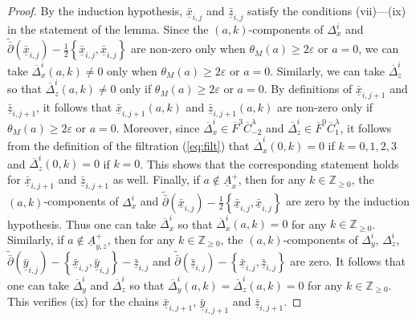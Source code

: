 \documentclass[a4paper]{article}
\numberwithin{equation}{section}
\begin{document}
\begin{proof}
By the induction hypothesis, $\bar{\underline{x}}_{i,j}$ and $\bar{\underline{z}}_{i,j}$ satisfy the conditions (vii)---(ix) in the statement of the lemma. Since the $(a,k)$-components of $\Delta_x^i$ and $\tilde{\bar{\partial}}(\bar{\underline{x}}_{i,j})-\frac{1}{2}\left\{\bar{\underline{x}}_{i,j},\bar{\underline{x}}_{i,j}\right\}$ are non-zero only when $\theta_M(a)\geq2\varepsilon$ or $a=0$, we can take $\overline{\Delta}_x^i(a,k)\neq0$ only when $\theta_M(a)\geq2\varepsilon$ or $a=0$. Similarly, we can take $\overline{\Delta}_z^i$ so that $\overline{\Delta}_z^i(a,k)\neq0$ only if $\theta_M(a)\geq2\varepsilon$ or $a=0$. By definitions of $\bar{\underline{x}}_{i,j+1}$ and $\bar{\underline{z}}_{i,j+1}$, it follows that $\bar{\underline{x}}_{i,j+1}(a,k)$ and $\bar{\underline{z}}_{i,j+1}(a,k)$ are non-zero only if $\theta_M(a)\geq2\varepsilon$ or $a=0$. Moreover, since $\overline{\Delta}_x^i\in\overline{F}^3\overline{C}_{-2}^\lambda$ and $\overline{\Delta}_z^i\in\overline{F}^0\overline{C}_1^\lambda$, it follows from the definition of the filtration (\ref{eq:filt}) that $\overline{\Delta}_x^i(0,k)=0$ if $k=0,1,2,3$ and $\overline{\Delta}_z^i(0,k)=0$ if $k=0$. This shows that the corresponding statement holds for $\bar{\underline{x}}_{i,j+1}$ and $\bar{\underline{z}}_{i,j+1}$ as well. Finally, if $a\notin\underline{A}_x^+$, then for any $k\in\mathbb{Z}_{\geq0}$, the $(a,k)$-components of $\Delta_x^i$ and $\tilde{\bar{\partial}}(\bar{\underline{x}}_{i,j})-\frac{1}{2}\left\{\bar{\underline{x}}_{i,j},\bar{\underline{x}}_{i,j}\right\}$ are zero by the induction hypothesis. Thus one can take $\overline{\Delta}_x^i$ so that $\overline{\Delta}_x^i(a,k)=0$ for any $k\in\mathbb{Z}_{\geq0}$. Similarly, if $a\notin\underline{A}_{y,z}^+$, then for any $k\in\mathbb{Z}_{\geq0}$, the $(a,k)$-components of $\Delta_y^i$, $\Delta_z^i$, $\tilde{\bar{\partial}}(\bar{\underline{y}}_{i,j})-\left\{\bar{\underline{x}}_{i,j},\bar{\underline{y}}_{i,j}\right\}-\bar{\underline{z}}_{i,j}$ and $\tilde{\bar{\partial}}(\bar{\underline{z}}_{i,j})-\left\{\bar{\underline{x}}_{i,j},\bar{\underline{z}}_{i,j}\right\}$ are zero. It follows that one can take $\overline{\Delta}_y^i$ and $\overline{\Delta}_z^i$ so that $\overline{\Delta}_y^i(a,k)=\overline{\Delta}_z^i(a,k)=0$ for any $k\in\mathbb{Z}_{\geq0}$. This verifies (ix) for the chains $\bar{\underline{x}}_{i,j+1}$, $\bar{\underline{y}}_{i,j+1}$ and $\bar{\underline{z}}_{i,j+1}$.
\end{proof}
\end{document}
